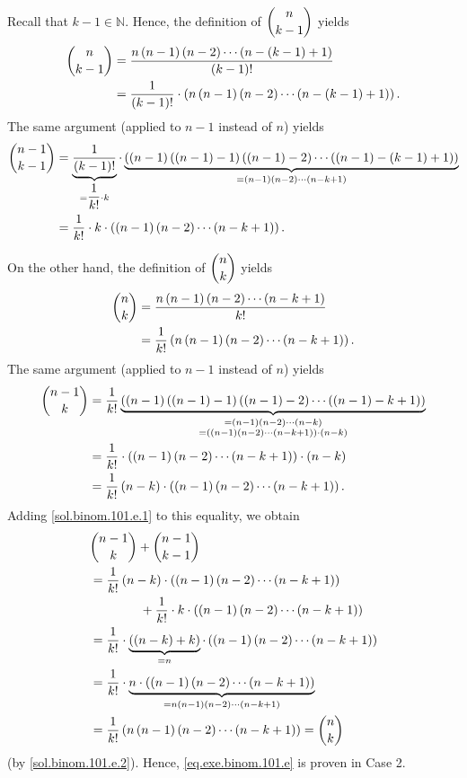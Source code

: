 \documentclass[paper=a4, fontsize=12pt]{scrartcl} %
\newcommand{\NN}{\mathbb{N}} %
\newcommand{\tup}[1]{\left( #1 \right)}
\newcommand{\underbrack}[2]{\underbrace{#1}_{\substack{#2}}}
\theoremstyle{plainsl}
\theoremstyle{definition}
\theoremstyle{remark}
\begin{document}
Recall that $k-1 \in \NN$. Hence, the definition of $\dbinom{n}{k-1}$
yields
\begin{align*}
\dbinom{n}{k-1}
&= \dfrac{n \tup{n-1} \tup{n-2} \cdots \tup{n - \tup{k-1} + 1}}{\tup{k-1}!} \\
&= \dfrac{1}{\tup{k-1}!} \cdot
    \tup{ n \tup{n-1} \tup{n-2} \cdots \tup{n - \tup{k-1} + 1} }.
\end{align*}
The same argument (applied to $n-1$ instead of $n$) yields
\begin{align}
\dbinom{n-1}{k-1}
&= \underbrack{\dfrac{1}{\tup{k-1}!}}{= \dfrac{1}{k!} \cdot k}
   \cdot
   \underbrack{\tup{ \tup{n-1} \tup{\tup{n-1} - 1} \tup{\tup{n-1} - 2}
                     \cdots \tup{\tup{n-1} - \tup{k-1} + 1} }}
              {= \tup{n-1} \tup{n-2} \cdots \tup{n-k+1} } \nonumber\\
&= \dfrac{1}{k!} \cdot k \cdot \tup{ \tup{n-1} \tup{n-2} \cdots \tup{n-k+1} } .
\label{sol.binom.101.e.1}
\end{align}

On the other hand, the definition of $\dbinom{n}{k}$ yields
\begin{align}
\dbinom{n}{k}
&= \dfrac{n \tup{n-1} \tup{n-2} \cdots \tup{n-k+1}}{k!} \nonumber \\
&= \dfrac{1}{k!} \tup{n \tup{n-1} \tup{n-2} \cdots \tup{n-k+1}} .
\label{sol.binom.101.e.2}
\end{align}
The same argument (applied to $n-1$ instead of $n$) yields
\begin{align*}
\dbinom{n-1}{k}
&= \dfrac{1}{k!}
     \underbrack{\tup{ \tup{n-1} \tup{\tup{n-1} - 1}
                       \tup{\tup{n-1} - 2} \cdots
                       \tup{\tup{n-1} - k + 1} }}
                {= \tup{n-1} \tup{n-2} \cdots \tup{n-k} \\
                 = \tup{\tup{n-1} \tup{n-2} \cdots \tup{n-k+1}} \cdot \tup{n-k} } \\
&= \dfrac{1}{k!}
   \cdot \tup{\tup{n-1} \tup{n-2} \cdots \tup{n-k+1}} \cdot \tup{n-k} \\
&= \dfrac{1}{k!} \tup{n-k} \cdot \tup{\tup{n-1} \tup{n-2} \cdots \tup{n-k+1}} .
\end{align*}
Adding \eqref{sol.binom.101.e.1} to this equality, we obtain
\begin{align*}
&  \dbinom{n-1}{k} + \dbinom{n-1}{k-1} \\
&= \dfrac{1}{k!} \tup{n-k} \cdot \tup{\tup{n-1} \tup{n-2} \cdots \tup{n-k+1}} \\
& \qquad \qquad + \dfrac{1}{k!} \cdot k \cdot \tup{ \tup{n-1} \tup{n-2} \cdots \tup{n-k+1} } \\
&= \dfrac{1}{k!} \cdot \underbrack{\tup{\tup{n-k}+k}}{= n}
     \cdot \tup{ \tup{n-1} \tup{n-2} \cdots \tup{n-k+1} } \\
&= \dfrac{1}{k!} \cdot
     \underbrack{n \cdot \tup{ \tup{n-1} \tup{n-2} \cdots \tup{n-k+1} }}
                {= n \tup{n-1} \tup{n-2} \cdots \tup{n-k+1}} \\
&= \dfrac{1}{k!} \tup{ n \tup{n-1} \tup{n-2} \cdots \tup{n-k+1} }
=\dbinom{n}{k}
\end{align*}
(by \eqref{sol.binom.101.e.2}).
Hence, \eqref{eq.exe.binom.101.e} is proven in Case 2.
\end{document}
